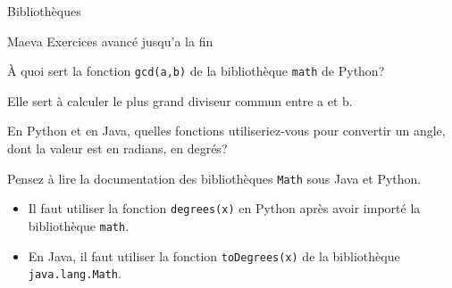 \begin{section}{Bibliothèques}
\begin{conseil}
\begin{note}{Maeva}
    Exercices avancé jusqu'a la fin
\end{note}
\end{conseil} 
\begin{Exercice}[3 minutes]
	À quoi sert la fonction \lstinline{gcd(a,b)} de la bibliothèque \lstinline{math} de Python? 
\end{Exercice} 
\begin{solution}
	Elle sert à calculer le plus grand diviseur commun entre a et b.
\end{solution} 
\begin{Exercice}[3 minutes]
    En Python et en Java, quelles fonctions utiliseriez-vous pour convertir un angle, dont la valeur est en radians, en degrés? 
\end{Exercice}
\begin{conseil}
    Pensez à lire la documentation des bibliothèques \lstinline{Math} sous Java et Python.
\end{conseil}
\begin{solution}
    \begin{itemize}
        \item Il faut utiliser la fonction \lstinline{degrees(x)} en Python après avoir importé la bibliothèque \lstinline{math}.
        \item En Java, il faut utiliser la fonction \lstinline{toDegrees(x)} de la bibliothèque \lstinline{java.lang.Math}.
    \end{itemize}


\end{solution}
\end{section}
